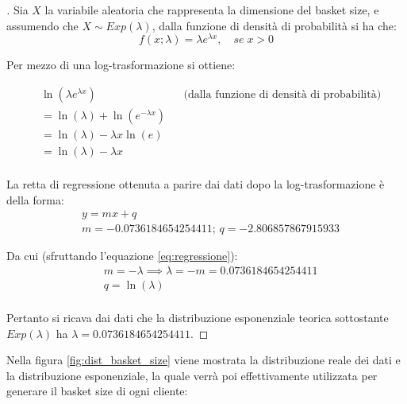\begin{proof}[\unskip\nopunct]
	Sia $X$ la variabile aleatoria che rappresenta la dimensione del basket size, e assumendo che $X \sim Exp(\lambda)$, dalla funzione di densità di probabilità si ha che:
	$$f(x;\lambda) = \lambda e^{\lambda x}, \quad se \; x > 0$$

	Per mezzo di una log-trasformazione si ottiene:

	\begin{equation}
			\label{eq:regressione}
		\begin{aligned}
			&\ln(\lambda e^{\lambda x}) &&\text{(dalla funzione di densità di probabilità)}\\
			&= \ln(\lambda) + \ln(e^{-\lambda x}) \\
			&= \ln(\lambda) - \lambda x \ln(e) \\
			&= \ln(\lambda) - \lambda x \\
		\end{aligned}
	\end{equation}

	La retta di regressione ottenuta a parire dai dati dopo la log-trasformazione è della forma:
	\begin{align*}
		&y = mx + q\\
		&m = -0.0736184654254411;\, q = -2.806857867915933
	\end{align*}

	Da cui (sfruttando l'equazione \ref{eq:regressione}):
		\begin{align*}
			&m = -\lambda \implies \lambda = -m = 0.0736184654254411\\
			&q = \ln(\lambda)\\
		\end{align*}

	Pertanto si ricava dai dati che la distribuzione esponenziale teorica sottostante $Exp(\lambda)$ ha $\lambda = 0.0736184654254411$.
\end{proof}

Nella figura \ref{fig:dist_basket_size} viene mostrata la distribuzione reale dei dati e la distribuzione esponenziale, la quale verrà poi effettivamente utilizzata per generare il basket size di ogni cliente:

